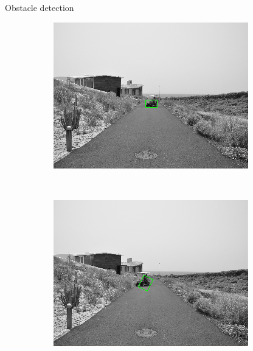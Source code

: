 \begin{frame}{Obstacle detection}
\begin{figure}[h!]
\begin{subfigure}[b]{0.24\columnwidth}
	  \includegraphics[width=\textwidth]{sequence/seq3}\label{fig:seq3}
      \end{subfigure}%
      ~
      \begin{subfigure}[b]{0.24\columnwidth}
	  \includegraphics[width=\textwidth]{sequence/seq4}\label{fig:seq4}
      \end{subfigure}%
      \\
      \begin{subfigure}[b]{0.24\columnwidth}

\end{subfigure}
\end{figure}
\end{frame}
